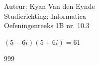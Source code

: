 \documentclass[a4paper]{article}
\begin{document}
  
\noindent \large Auteur: Kyan Van den Eynde \\
\noindent \large Studierichting: Informatica\\
\noindent \large Oefeningenreeks 1B nr. 10.3\\

\medskip

\normalsize

$(5-6i)(5+6i) = 61$\\

\begin{thebibliography}{999}
\end{thebibliography}
\end{document}
